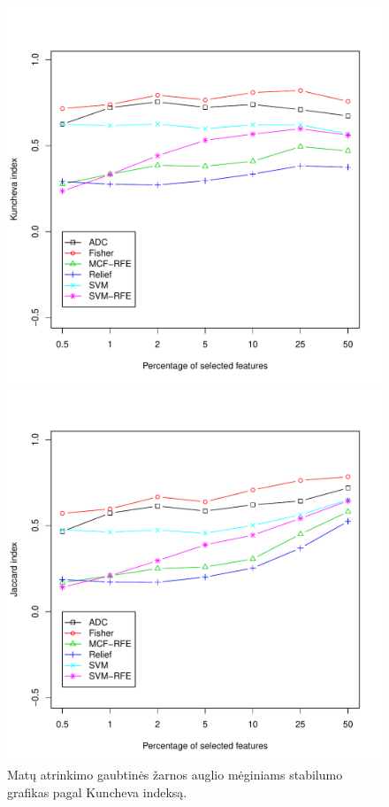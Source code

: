 \begin{figure}[H]
\begin{minipage}[b]{0.5\linewidth}
\centering
\includegraphics[width=.85\textwidth]{../bachelor/images/nncolon_robustness_kuncheva.pdf}
\caption{Matų atrinkimo gaubtinės žarnos auglio mėginiams stabilumo grafikas pagal Kuncheva indeksą.}
\label{fig:robk_colon}
\end{minipage}
\hspace{0.2cm}
\begin{minipage}[b]{0.5\linewidth}
\centering
\includegraphics[width=.85\textwidth]{../bachelor/images/nncolon_robustness_jaccard.pdf}

\end{minipage}
\end{figure}

